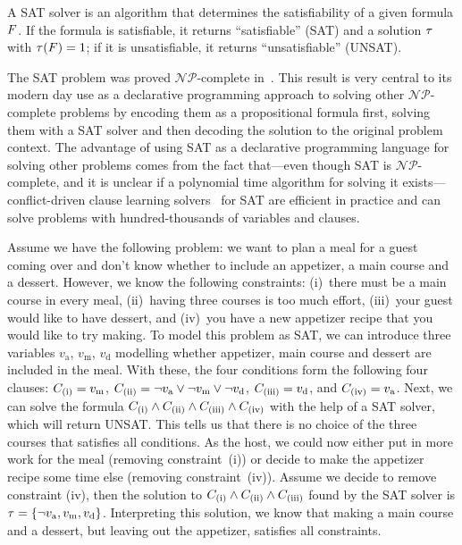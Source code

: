 A SAT solver is an algorithm that determines the satisfiability of a given formula $F$.
If the formula is satisfiable, it returns ``satisfiable'' (SAT) and a solution $\tau$ with $\tau(F)=1$;
if it is unsatisfiable, it returns ``unsatisfiable'' (UNSAT).

The SAT problem was proved $\mathcal{NP}$-complete in~\textcite{DBLP:conf/stoc/Cook71}.
This result is very central to its modern day use as a declarative programming approach to solving other $\mathcal{NP}$-complete problems by encoding them as a propositional formula first, solving them with a SAT solver and then decoding the solution to the original problem context.
The advantage of using SAT as a declarative programming language for solving other problems comes from the fact that---even though SAT is $\mathcal{NP}$-complete, and it is unclear if a polynomial time algorithm for solving it exists---conflict-driven clause learning solvers~\autocite{handbook2-cdcl} for SAT are efficient in practice and can solve problems with hundred-thousands of variables and clauses.

\begin{example}
  Assume we have the following problem:
  we want to plan a meal for a guest coming over and don't know whether to include an appetizer, a main course and a dessert.
  However, we know the following constraints:
  (i)~there must be a main course in every meal, (ii)~having three courses is too much effort, (iii)~your guest would like to have dessert, and (iv)~you have a new appetizer recipe that you would like to try making.
  To model this problem as SAT, we can introduce three variables $v_\text{a}$, $v_\text{m}$, $v_\text{d}$ modelling whether appetizer, main course and dessert are included in the meal.
  With these, the four conditions form the following four clauses:
  $C_\text{(i)} = v_\text{m}$, $C_\text{(ii)} = \lnot v_\text{a} \lor \lnot v_\text{m} \lor \lnot v_\text{d}$, $C_\text{(iii)} = v_\text{d}$, and $C_\text{(iv)} = v_\text{a}$.
  Next, we can solve the formula $C_\text{(i)} \land C_\text{(ii)} \land C_\text{(iii)} \land C_\text{(iv)}$ with the help of a SAT solver, which will return UNSAT.
  This tells us that there is no choice of the three courses that satisfies all conditions.
  As the host, we could now either put in more work for the meal (removing constraint~(i)) or decide to make the appetizer recipe some time else (removing constraint~(iv)).
  Assume we decide to remove constraint (iv), then the solution to $C_\text{(i)} \land C_\text{(ii)} \land C_\text{(iii)}$ found by the SAT solver is $\tau = \{ \lnot v_\text{a}, v_\text{m}, v_\text{d} \}$.
  Interpreting this solution, we know that making a main course and a dessert, but leaving out the appetizer, satisfies all constraints.
\end{example}

